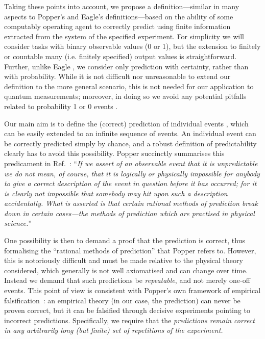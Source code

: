 \documentclass[%
 superscriptaddress,
 preprint,
 showpacs,
 showkeys,
 preprintnumbers,
  amsmath,amssymb,
  aps,
 pra,
  longbibliography,
  floatfix,
 ]{revtex4-1}
\theoremstyle{definition}
\begin{document}
Taking these points into account, we propose a definition---similar in many aspects to Popper's and Eagle's definitions---based on the ability of some computably operating agent to correctly predict using finite information extracted from the system of the specified experiment. 
For simplicity we will consider tasks with binary observable values (0 or 1), but the extension to finitely or countable many (i.e. finitely specified) output values is straightforward.
Further, unlike Eagle \cite{Eagle:2005ys}, we consider only prediction with certainty, rather than with probability.
While it is not difficult nor  unreasonable to extend our definition to the more general scenario, this is not needed for our application to quantum measurements;
moreover,  in doing so we avoid any potential pitfalls related to probability 1 or 0 events \cite{Zaman:1987gd}.

Our main aim is to define the (correct) prediction of individual events \cite{Eagle:2005ys}, which can be easily extended to an infinite sequence of events.
An individual event can be correctly predicted simply by chance, and a robust definition of predictability clearly has to  avoid this possibility.
Popper succinctly summarises this predicament in Ref.~\cite[117--118]{popper-50i}:
``\emph{If we assert of an observable event that it is unpredictable we do not mean, of course, that it is logically or physically impossible for anybody to give a correct description of the event in question before it has occurred;
for it is clearly not impossible that somebody may hit upon such a description accidentally.
What is asserted is that certain rational methods of prediction break down in certain cases---the methods of prediction which are practised in physical science.}''

One possibility is then to demand a proof that the prediction is correct,  thus formalising the ``rational methods of prediction'' that Popper refers to.
However, this is notoriously difficult and must be made relative to the physical theory considered, which generally is not well axiomatised and can change over time.
Instead we demand that such predictions be {\em repeatable}, and not merely one-off events.
This point of view is consistent with Popper's own framework of empirical falsification~\cite{popper,popper-en}: an empirical theory (in our case, the prediction) can never be proven correct, but it can be falsified through decisive experiments pointing to incorrect predictions.
Specifically, we require that the {\em predictions remain correct in any arbitrarily long (but finite) set of repetitions of the experiment.}
\end{document}
